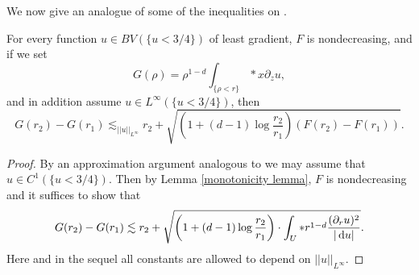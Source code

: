 We now give an analogue of some of the inequalities on \cite[pg71]{Giusti77}.

\begin{lemma}\label{Monotonicity Formula}
For every function $u \in BV(\{u < 3/4\})$ of least gradient, $F$ is nondecreasing, and if we set
$$G(\rho) = \rho^{1 - d} \int_{\{\rho < r\}} *x\partial_zu,$$
and in addition assume $u \in L^\infty(\{u < 3/4\})$, then
\begin{equation}\label{StrongMonotonicity}
G(r_2) - G(r_1) \lesssim_{||u||_{L^\infty}} r_2 + \sqrt{\left(1 + (d - 1)\log \frac{r_2}{r_1}\right)(F(r_2) - F(r_1))}.
\end{equation}
\end{lemma}
\begin{proof}
By an approximation argument analogous to \cite[pg68]{Giusti77} we may assume that $u \in C^1(\{u < 3/4\})$.
Then by Lemma \ref{monotonicity lemma}, $F$ is nondecreasing and it suffices to show that 
\begin{equation}\label{monotonicity wts}
G(r_2) - G(r_1) \lesssim r_2 + \sqrt{\left(1 + (d - 1)\log \frac{r_2}{r_1}\right) \cdot \int_U *r^{1 - d}\frac{(\partial_ru)^2}{|\mathop{}\!\mathrm{d} u|}}.
\end{equation}
Here and in the sequel all constants are allowed to depend on $||u||_{L^\infty}$.


\end{proof}
